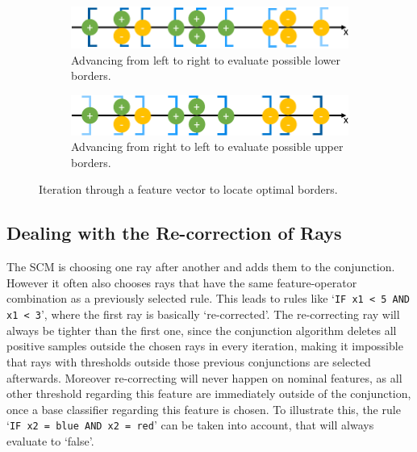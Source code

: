 \begin{figure}[ht]
    \centering
    \begin{subfigure}{\textwidth}
        \centering
        \includegraphics[width=0.85\columnwidth]{figures/lower_border.pdf}
        \caption{Advancing from left to right to evaluate possible lower borders.}\label{fig:lowerBorder}
    \end{subfigure}
    \hfill
    \begin{subfigure}{\textwidth}
        \centering
        \includegraphics[width=0.85\columnwidth]{figures/upper_border.pdf}
        \caption{Advancing from right to left to evaluate possible upper borders.}\label{fig:upperBorder}
    \end{subfigure}
    \caption{Iteration through a feature vector to locate optimal borders.}\label{fig:borders}
\end{figure}

\subsection{Dealing with the Re-correction of Rays}

The SCM is choosing one ray after another and adds them to the conjunction.
However it often also chooses rays that have the same feature-operator combination as a previously selected rule.
This leads to rules like `\texttt{IF x1 < 5 AND x1 < 3}', where the first ray is basically `re-corrected'.
The re-correcting ray will always be tighter than the first one, since the conjunction
algorithm deletes all positive samples outside the chosen rays in every iteration,
making it impossible that rays with thresholds outside those previous conjunctions are selected afterwards.
Moreover re-correcting will never happen on nominal features, as all other threshold regarding this feature
are immediately outside of the conjunction, once a base classifier regarding this feature is chosen.
To illustrate this, the rule `\texttt{IF x2 = blue AND x2 = red}' can be taken into account, that will always evaluate to `false'.

